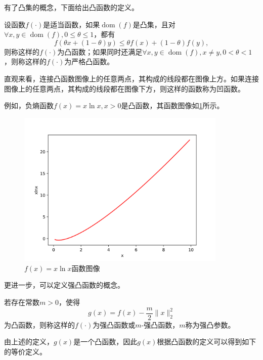 有了凸集的概念，下面给出凸函数\cite{2004Convex}的定义。

\begin{definition}
    设函数$f(\cdot)$是适当函数，如果$\mathop{\mathrm{dom}} (f)$是凸集，且对$\forall x, y\in \mathop{\mathrm{dom}} (f), 0\leq \theta \leq 1$，都有
    \begin{equation}
        f(\theta x+(1-\theta)y) \leq \theta f(x) + (1-\theta)f(y),
    \end{equation}
    则称这样的$f(\cdot)$为凸函数；如果同时还满足$\forall x, y\in \mathop{\mathrm{dom}} (f), x \neq y, 0<\theta<1$，则称这样的$f(\cdot)$为严格凸函数。
\end{definition}

直观来看，连接凸函数图像上的任意两点，其构成的线段都在图像上方。如果连接图像上的任意两点，其构成的线段都在图像下方，则这样的函数称为凹函数。

例如，负熵函数$f(x)=x\ln x, x>0$是凸函数，其函数图像如\ref{figure_xlnx}所示。

\begin{figure}[hbtp]
    \centering
    \includegraphics[width=100mm]{./Figures/xlnx_figure.png}
    \caption{$f(x)=x\ln x$函数图像}
    \label{figure_xlnx}
\end{figure}

更进一步，可以定义强凸函数\cite{2004Convex}的概念。

\begin{definition}\label{def_convex_1}
    若存在常数$m>0$，使得
    \begin{equation}
        g(x) = f(x) - \frac{m}{2}\|x\|_{2}^{2}
    \end{equation}
    为凸函数，则称这样的$f(\cdot)$为强凸函数或$m$-强凸函数，$m$称为强凸参数。
\end{definition}

由上述的定义，$g(x)$是一个凸函数，因此$g(x)$根据凸函数的定义可以得到如下的等价定义。


